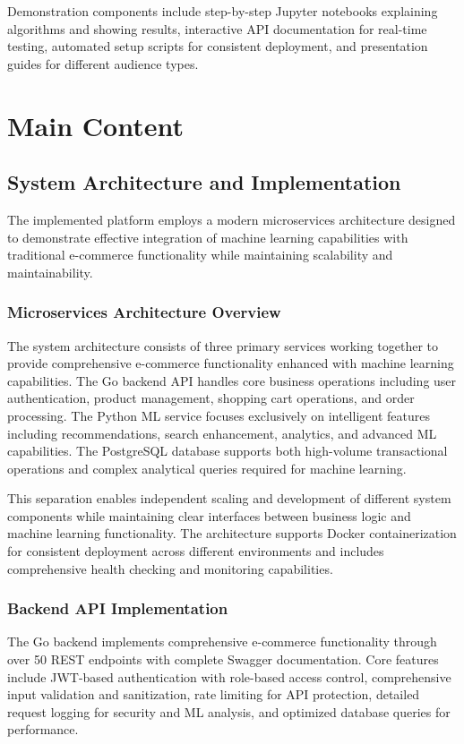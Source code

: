 \documentclass[12pt]{article}
\begin{document}
Demonstration components include step-by-step Jupyter notebooks explaining algorithms and showing results, interactive API documentation for real-time testing, automated setup scripts for consistent deployment, and presentation guides for different audience types.

\section{Main Content}

\subsection{System Architecture and Implementation}
The implemented platform employs a modern microservices architecture designed to demonstrate effective integration of machine learning capabilities with traditional e-commerce functionality while maintaining scalability and maintainability.

\subsubsection{Microservices Architecture Overview}
The system architecture consists of three primary services working together to provide comprehensive e-commerce functionality enhanced with machine learning capabilities. The Go backend API handles core business operations including user authentication, product management, shopping cart operations, and order processing. The Python ML service focuses exclusively on intelligent features including recommendations, search enhancement, analytics, and advanced ML capabilities. The PostgreSQL database supports both high-volume transactional operations and complex analytical queries required for machine learning.

This separation enables independent scaling and development of different system components while maintaining clear interfaces between business logic and machine learning functionality. The architecture supports Docker containerization for consistent deployment across different environments and includes comprehensive health checking and monitoring capabilities.

\subsubsection{Backend API Implementation}
The Go backend implements comprehensive e-commerce functionality through over 50 REST endpoints with complete Swagger documentation. Core features include JWT-based authentication with role-based access control, comprehensive input validation and sanitization, rate limiting for API protection, detailed request logging for security and ML analysis, and optimized database queries for performance.
\end{document}
